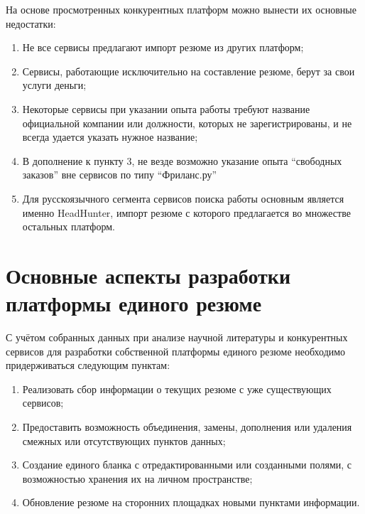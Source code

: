 \documentclass[master, och, pract]{SCWorks}
\begin{document}
На основе просмотренных конкурентных платформ можно вынести их основные недостатки:
\begin{enumerate}
    \item Не все сервисы предлагают импорт резюме из других платформ;
    \item Сервисы, работающие исключительно на составление резюме, берут за свои услуги деньги;
    \item Некоторые сервисы при указании опыта работы требуют название официальной 
    компании или должности, которых не зарегистрированы, 
    и не всегда удается указать нужное название;
    \item В дополнение к пункту 3, не везде возможно указание опыта “свободных заказов” 
    вне сервисов по типу “Фриланс.ру”
    \item Для русскоязычного сегмента сервисов поиска работы основным является именно 
    HeadHunter, импорт резюме с которого предлагается во множестве остальных платформ.
\end{enumerate}


\section{Основные аспекты разработки платформы единого резюме}
С учётом собранных данных при анализе научной литературы и конкурентных сервисов 
для разработки собственной платформы единого резюме необходимо придерживаться следующим пунктам:
\begin{enumerate}
    \item Реализовать сбор информации о текущих резюме с уже существующих сервисов;
    \item Предоставить возможность объединения, замены, дополнения или удаления 
    смежных или отсутствующих пунктов данных;
    \item Создание единого бланка с отредактированными или созданными полями, 
    с возможностью хранения их на личном пространстве;
    \item Обновление резюме на сторонних площадках новыми пунктами информации.
\end{enumerate}
\end{document}
